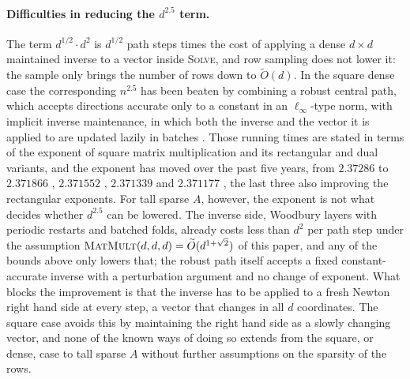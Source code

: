 \documentclass[11pt]{article}
\newcommand{\MM}{\textsc{MatMult}}
\renewcommand{\O}{\widetilde O}
\begin{document}
\paragraph{Difficulties in reducing the $d^{2.5}$ term.}
The term $d^{1/2} \cdot d^{2}$ is
$d^{1/2}$ path steps times the cost of applying a dense
$d \times d$ maintained inverse to a vector inside \textsc{Solve}, and row
sampling does not lower it: the sample only brings the number of rows down to
$\O(d)$.
In the square dense case the corresponding $n^{2.5}$ has been beaten by
combining a robust central path, which accepts directions accurate only to a
constant in an $\ell_\infty$-type norm, with implicit inverse maintenance, in
which both the inverse and the vector it is applied to are updated lazily in
batches
\cite{CLS21:journal,B20,JSWZ21}.
Those running times are stated in terms of the exponent of square matrix
multiplication and its rectangular and dual variants, and the exponent has moved
over the past five years, from $2.37286$ \cite{AVW21} to
$2.371866$ \cite{DWZ23},
$2.371552$ \cite{VXXZ24},
$2.371339$ \cite{ADVXXZ25} and
$2.371177$
\cite{DEKMRSZAVB26:arxiv},
the last three also improving the rectangular exponents.
For tall sparse $A$, however, the exponent is not what decides whether
$d^{2.5}$ can be lowered.
The inverse side, Woodbury layers with periodic restarts and batched folds,
already costs less than $d^{2}$ per path step under the assumption
$\MM(d, d, d) = \O(d^{1 + \sqrt{2}})$ of this paper, and any of the bounds above
only lowers that; the robust path itself accepts a fixed constant-accurate
inverse with a perturbation argument and no change of exponent.
What blocks the improvement is that the inverse has to be applied to a fresh
Newton right hand side at every step, a vector that changes in all $d$
coordinates.
The square case avoids this by maintaining the right hand side as a slowly
changing vector, and none of the known ways of doing so extends from the square,
or dense, case to tall sparse $A$ without further assumptions on the sparsity of
the rows.
\end{document}
